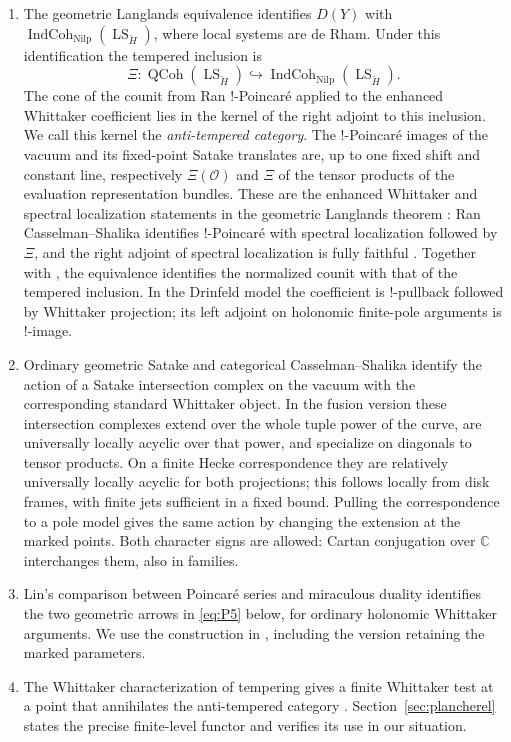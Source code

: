\begin{enumerate}
\item The geometric Langlands equivalence identifies $D(Y)$ with
$\operatorname{IndCoh}_{\operatorname{Nilp}}
(\operatorname{LS}_{\check H})$, where local systems are de Rham.
Under this identification the tempered inclusion is
\[
 \Xi:\operatorname{QCoh}(\operatorname{LS}_{\check H})
       \hookrightarrow
       \operatorname{IndCoh}_{\operatorname{Nilp}}
                         (\operatorname{LS}_{\check H}).
\]
The cone of the counit from Ran $!$-Poincar\'e applied to the enhanced
Whittaker coefficient lies in the kernel of the right adjoint to this
inclusion.  We call this kernel the \emph{anti-tempered category}.
The $!$-Poincar\'e images of the vacuum and its fixed-point Satake
translates are, up to one fixed shift and constant line, respectively
$\Xi(\mathcal O)$ and $\Xi$ of the tensor products of the evaluation
representation bundles.  These are the enhanced Whittaker and spectral
localization statements in the geometric Langlands theorem
\cite{GLCI,GLCII,GLCIII,GLCIV,GLCV}: Ran Casselman--Shalika identifies
$!$-Poincar\'e with spectral localization followed by $\Xi$, and the
right adjoint of spectral localization is fully faithful
\cite[Section~18.1.1, Proposition~18.1.6 and Equation~(18.4)]{GLCII}.
Together with \cite[Section~5.1 and Equation~(5.1)]{GLCI}, the
equivalence identifies the normalized counit with that of the
tempered inclusion.  In the
Drinfeld model the coefficient is $!$-pullback followed by Whittaker
projection; its left adjoint on holonomic finite-pole arguments is
$!$-image.

\item Ordinary geometric Satake and categorical Casselman--Shalika
identify the action of a Satake intersection complex on the vacuum
with the corresponding standard Whittaker object.  In the fusion
version these intersection complexes extend over the whole tuple
power of the curve, are universally locally acyclic over that power,
and specialize on diagonals to tensor products.  On a finite Hecke
correspondence they are relatively universally locally acyclic for
both projections; this follows locally from disk frames, with finite
jets sufficient in a fixed bound.  Pulling the correspondence to a
pole model gives the same action by changing the extension at the
marked points.  Both character signs are allowed: Cartan conjugation
over $\mathbb C$ interchanges them, also in families.

\item Lin's comparison between Poincar\'e series and miraculous
duality identifies the two geometric arrows in
\eqref{eq:P5} below, for ordinary holonomic Whittaker arguments.
We use the construction in
\cite[Propositions~2.2.4--2.2.5, Section~2.2.6,
Section~8.1.3 and Proposition~8.1.4]{Lin}, including
the version retaining the marked parameters.

\item The Whittaker characterization of tempering gives a finite
Whittaker test at a point that annihilates the anti-tempered category
\cite{FaergemanRaskin}.  Section~\ref{sec:plancherel} states the
precise finite-level functor and verifies its use in our situation.
\end{enumerate}

